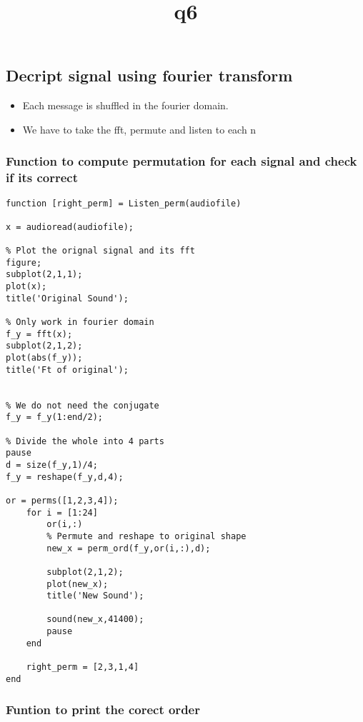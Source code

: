 \documentclass[11pt]{article}
\title{q6}
\providecommand{\tightlist}{%
      \setlength{\itemsep}{0pt}\setlength{\parskip}{0pt}}
\begin{document}
    
    
    \maketitle
    
    

    
    \subsection{Decript signal using fourier
transform}\label{decript-signal-using-fourier-transform}

\begin{itemize}
\tightlist
\item
  Each message is shuffled in the fourier domain.
\item
  We have to take the fft, permute and listen to each n
\end{itemize}

    \subsubsection{Function to compute permutation for each signal and check
if its
correct}\label{function-to-compute-permutation-for-each-signal-and-check-if-its-correct}

\begin{verbatim}
function [right_perm] = Listen_perm(audiofile)

x = audioread(audiofile);

% Plot the orignal signal and its fft
figure;
subplot(2,1,1);
plot(x);
title('Original Sound');

% Only work in fourier domain
f_y = fft(x);
subplot(2,1,2);
plot(abs(f_y));
title('Ft of original');


% We do not need the conjugate
f_y = f_y(1:end/2);

% Divide the whole into 4 parts 
pause
d = size(f_y,1)/4;
f_y = reshape(f_y,d,4);

or = perms([1,2,3,4]);
    for i = [1:24]
        or(i,:)
        % Permute and reshape to original shape
        new_x = perm_ord(f_y,or(i,:),d);
        
        subplot(2,1,2);
        plot(new_x);
        title('New Sound');

        sound(new_x,41400);
        pause
    end

    right_perm = [2,3,1,4]
end
\end{verbatim}

    \subsubsection{Funtion to print the corect
order}\label{funtion-to-print-the-corect-order}
\end{document}
